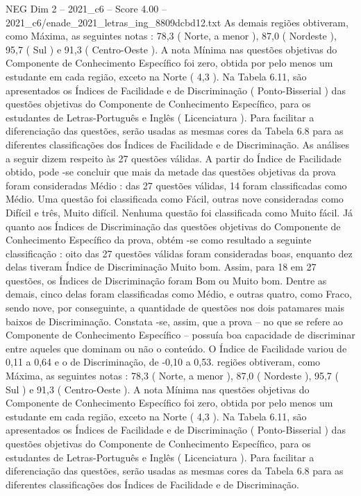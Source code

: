 \begin{textsample}{NEG Dim 2 – 2021\_c6 – Score 4.00 – 2021\_c6/enade\_2021\_letras\_ing\_8809dcbd12.txt}
As demais regiões obtiveram, como Máxima, as seguintes notas : 78,3 ( Norte, a menor ), 87,0 ( Nordeste ), 95,7 ( Sul ) e 91,3 ( Centro-Oeste ).
A nota Mínima nas questões objetivas do Componente de Conhecimento Específico foi zero, obtida por pelo menos um estudante em cada região, exceto na Norte ( 4,3 ).
Na Tabela 6.11, são apresentados os Índices de Facilidade e de Discriminação ( Ponto-Bisserial ) das questões objetivas do Componente de Conhecimento Específico, para os estudantes de Letras-Português e Inglês ( Licenciatura ).
Para facilitar a diferenciação das questões, serão usadas as mesmas cores da Tabela 6.8 para as diferentes classificações dos Índices de Facilidade e de Discriminação.
As análises a seguir dizem respeito às 27 questões válidas.
A partir do Índice de Facilidade obtido, pode -se concluir que mais da metade das questões objetivas da prova foram consideradas Médio : das 27 questões válidas, 14 foram classificadas como Médio.
Uma questão foi classificada como Fácil, outras nove consideradas como Difícil e três, Muito difícil.
Nenhuma questão foi classificada como Muito fácil.
Já quanto aos Índices de Discriminação das questões objetivas do Componente de Conhecimento Específico da prova, obtém -se como resultado a seguinte classificação : oito das 27 questões válidas foram consideradas boas, enquanto dez delas tiveram Índice de Discriminação Muito bom.
Assim, para 18 em 27 questões, os Índices de Discriminação foram Bom ou Muito bom.
Dentre as demais, cinco delas foram classificadas como Médio, e outras quatro, como Fraco, sendo nove, por conseguinte, a quantidade de questões nos dois patamares mais baixos de Discriminação.
Constata -se, assim, que a prova – no que se refere ao Componente de Conhecimento Específico – possuía boa capacidade de discriminar entre aqueles que dominam ou não o conteúdo.
O Índice de Facilidade variou de 0,11 a 0,64 e o de Discriminação, de -0,10 a 0,53. regiões obtiveram, como Máxima, as seguintes notas : 78,3 ( Norte, a menor ), 87,0 ( Nordeste ), 95,7 ( Sul ) e 91,3 ( Centro-Oeste ).
A nota Mínima nas questões objetivas do Componente de Conhecimento Específico foi zero, obtida por pelo menos um estudante em cada região, exceto na Norte ( 4,3 ).
Na Tabela 6.11, são apresentados os Índices de Facilidade e de Discriminação ( Ponto-Bisserial ) das questões objetivas do Componente de Conhecimento Específico, para os estudantes de Letras-Português e Inglês ( Licenciatura ).
Para facilitar a diferenciação das questões, serão usadas as mesmas cores da Tabela 6.8 para as diferentes classificações dos Índices de Facilidade e de Discriminação.

\end{textsample}
